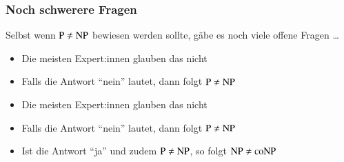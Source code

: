 \documentclass[aspectratio=1610,onlymath]{beamer}
\begin{document}
\begin{frame}\frametitle{Noch schwerere Fragen}

Selbst wenn ${\textsc{P}}\neq{\textsc{NP}}$ bewiesen werden sollte, gäbe es noch viele
offene Fragen \ldots\bigskip\pause

%
\begin{itemize}
\item Die meisten Expert:innen glauben das nicht
\item Falls die Antwort "`nein"' lautet, dann folgt ${\textsc{P}}\neq{\textsc{NP}}$
\end{itemize}\bigskip\pause

%
\begin{itemize}
\item Die meisten Expert:innen glauben das nicht
\item Falls die Antwort "`nein"' lautet, dann folgt ${\textsc{P}}\neq{\textsc{NP}}$
\item Ist die Antwort "`ja"' und zudem ${\textsc{P}}\neq{\textsc{NP}}$, so folgt ${\textsc{NP}}\neq{\textsc{coNP}}$
\end{itemize}\bigskip

\end{frame}
\end{document}
